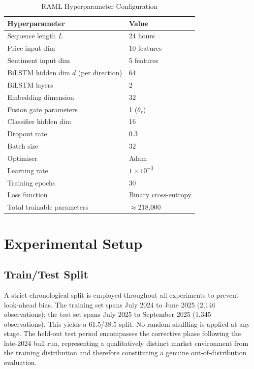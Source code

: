 \documentclass[journal]{IEEEtran}
\newcommand{\bilstm}{BiLSTM}
\begin{document}
\begin{table}[!t]
  \centering
  \caption{RAML Hyperparameter Configuration}
  \label{tab:model}
  \renewcommand{\arraystretch}{1.15}
  \begin{tabular}{ll}
    \toprule
    \textbf{Hyperparameter} & \textbf{Value} \\
    \midrule
    Sequence length $L$ & 24 hours \\
    Price input dim & 10 features \\
    Sentiment input dim & 5 features \\
    \bilstm{} hidden dim $d$ (per direction) & 64 \\
    \bilstm{} layers & 2 \\
    Embedding dimension & 32 \\
    Fusion gate parameters & 1 ($\theta_r$) \\
    Classifier hidden dim & 16 \\
    Dropout rate & 0.3 \\
    Batch size & 32 \\
    Optimiser & Adam~\cite{kingma2014adam} \\
    Learning rate & $1 \times 10^{-3}$ \\
    Training epochs & 30 \\
    Loss function & Binary cross-entropy \\
    Total trainable parameters & ${\approx}$218,000 \\
    \bottomrule
  \end{tabular}
\end{table}

\section{Experimental Setup}
\label{sec:exp}

\subsection{Train/Test Split}
A strict chronological split is employed throughout all experiments to prevent
look-ahead bias. The training set spans July 2024 to June 2025 (2,146
observations); the test set spans July 2025 to September 2025 (1,345
observations). This yields a 61.5/38.5 split. No random shuffling is applied
at any stage. The held-out test period encompasses the corrective phase following
the late-2024 bull run, representing a qualitatively distinct market environment
from the training distribution and therefore constituting a genuine
out-of-distribution evaluation.
\end{document}
